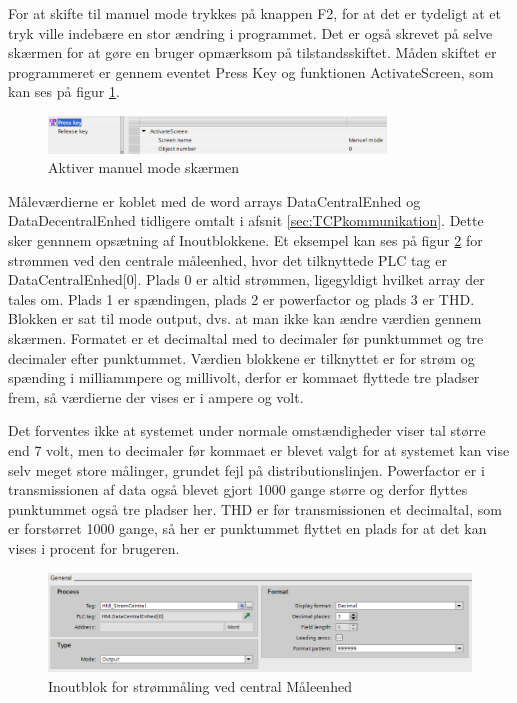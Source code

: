 For at skifte til manuel mode trykkes på knappen F2, for at det er tydeligt at et tryk ville indebære en stor ændring i programmet. Det er også skrevet på selve skærmen for at gøre en bruger opmærksom på tilstandsskiftet. Måden skiftet er programmeret er gennem eventet Press Key og funktionen ActivateScreen, som kan ses på figur \ref{fig:ActivateScreen}.

\begin{figure}[H] %
	\centering
	\includegraphics[width=0.8\textwidth]{Figure/ActivateScreen}
	\caption{Aktiver manuel mode skærmen}
	\label{fig:ActivateScreen}
\end{figure}

Måleværdierne er koblet med de word arrays DataCentralEnhed og DataDecentralEnhed tidligere omtalt i afsnit \ref{sec:TCPkommunikation}. Dette sker gennnem opsætning af Inoutblokkene. Et eksempel kan ses på figur \ref{fig:OutputblokMaelingStroemCentral} for strømmen ved den centrale måleenhed, hvor det tilknyttede PLC tag er DataCentralEnhed[0]. Plads 0 er altid strømmen, ligegyldigt hvilket array der tales om. Plads 1 er spændingen, plads 2 er powerfactor og plads 3 er THD. Blokken er sat til mode output, dvs. at man ikke kan ændre værdien gennem skærmen. Formatet er et decimaltal med to decimaler før punktummet og tre decimaler efter punktummet.
Værdien blokkene er tilknyttet er for strøm og spænding i milliammpere og millivolt, derfor er kommaet flyttede tre pladser frem, så værdierne der vises er i ampere og volt.


Det forventes ikke at systemet under normale omstændigheder viser tal større end 7 volt, men to decimaler før kommaet er blevet valgt for at systemet kan vise selv meget store målinger, grundet fejl på distributionslinjen. Powerfactor er i transmissionen af data også blevet gjort 1000 gange større og derfor flyttes punktummet også tre pladser her. THD er før transmissionen et decimaltal, som er forstørret 1000 gange, så her er punktummet flyttet en plads for at det kan vises i procent for brugeren.

\begin{figure}[H] %
	\centering
	\includegraphics[width=1\textwidth]{Figure/OutputblokMaelingStroemCentral}
	\caption{Inoutblok for strømmåling ved central Måleenhed}
	\label{fig:OutputblokMaelingStroemCentral}
\end{figure}


